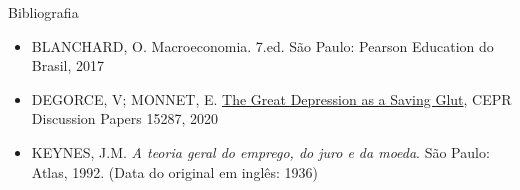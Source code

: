 \documentclass[10pt]{beamer}
\begin{document}
\begin{frame}{ Bibliografia}
    \begin{itemize}
        \item BLANCHARD, O. Macroeconomia. 7.ed. São Paulo: Pearson Education do Brasil, 2017\medskip
        \item DEGORCE, V; MONNET, E. \href{https://papers.ssrn.com/sol3/papers.cfm?abstract_id=3696369}{The Great Depression as a Saving Glut}, CEPR Discussion Papers 15287, 2020\medskip
        \item KEYNES, J.M. \emph{A teoria geral do emprego, do juro e da moeda}. São Paulo: Atlas, 1992. (Data do original em inglês: 1936)\medskip
    \end{itemize}
\end{frame}
\end{document}
